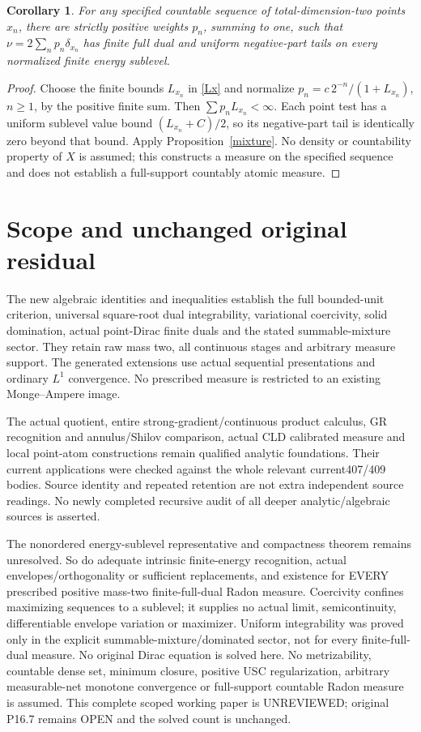\documentclass[11pt]{article}
\newtheorem{corollary}[theorem]{Corollary}
\begin{document}
\begin{corollary}\label{countable}
For any specified countable sequence of total-dimension-two points
$x_n$, there are strictly positive weights $p_n$, summing to one, such
that $\nu=2\sum_n p_n\delta_{x_n}$ has finite full dual and uniform
negative-part tails on every normalized finite energy sublevel.
\end{corollary}
\begin{proof}
Choose the finite bounds $L_{x_n}$ in \eqref{Lx} and normalize
$p_n=c\,2^{-n}/(1+L_{x_n})$, $n\ge1$, by the positive finite sum.
Then $\sum p_nL_{x_n}<\infty$. Each point test has a uniform
sublevel value bound $(L_{x_n}+C)/2$, so its negative-part tail is
identically zero beyond that bound. Apply Proposition~\ref{mixture}.
No density or countability property of $X$ is assumed; this constructs
a measure on the specified sequence and does not establish a
full-support countably atomic measure.
\end{proof}

\section{Scope and unchanged original residual}
The new algebraic identities and inequalities establish the full
bounded-unit criterion, universal square-root dual integrability,
variational coercivity, solid domination, actual point-Dirac finite
duals and the stated summable-mixture sector. They retain raw mass two,
all continuous stages and arbitrary measure support. The generated
extensions use actual sequential presentations and ordinary $L^1$
convergence. No prescribed measure is restricted to an existing
Monge--Ampere image.

The actual quotient, entire strong-gradient/continuous product calculus,
GR recognition and annulus/Shilov comparison, actual CLD calibrated
measure and local point-atom constructions remain qualified analytic
foundations. Their current applications were checked against the whole
relevant current407/409 bodies. Source identity and repeated retention
are not extra independent source readings. No newly completed recursive
audit of all deeper analytic/algebraic sources is asserted.

The nonordered energy-sublevel representative and compactness theorem
remains unresolved. So do adequate intrinsic finite-energy recognition,
actual envelopes/orthogonality or sufficient replacements, and existence
for EVERY prescribed positive mass-two finite-full-dual Radon measure.
Coercivity confines maximizing sequences to a sublevel; it supplies no
actual limit, semicontinuity, differentiable envelope variation or
maximizer. Uniform integrability was proved only in the explicit
summable-mixture/dominated sector, not for every finite-full-dual
measure. No original Dirac equation is solved here. No metrizability,
countable dense set, minimum closure, positive USC regularization,
arbitrary measurable-net monotone convergence or full-support
countable Radon measure is assumed. This complete scoped working paper
is UNREVIEWED; original P16.7 remains OPEN and the solved count is
unchanged.
\end{document}
